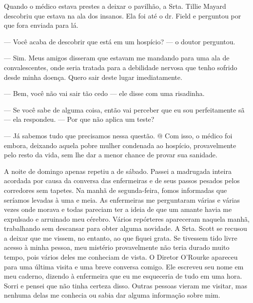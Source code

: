 Quando o médico estava prestes a deixar o pavilhão, a Srta. Tillie
Mayard descobriu que estava na ala dos insanos. Ela foi até o dr. Field
e perguntou por que fora enviada para lá.

--- Você acaba de descobrir que está em um hospício? --- o doutor
perguntou.

--- Sim. Meus amigos disseram que estavam me mandando para uma ala de
convalescentes, onde seria tratada para a debilidade nervosa que tenho
sofrido desde minha doença. Quero sair deste lugar imediatamente.

--- Bem, você não vai sair tão cedo --- ele disse com uma risadinha.

--- Se você sabe de alguma coisa, então vai perceber que eu sou
perfeitamente sã --- ela respondeu. --- Por que não aplica um teste?

--- Já sabemos tudo que precisamos nessa questão. @ Com isso, o médico
foi embora, deixando aquela pobre mulher condenada ao hospício,
provavelmente pelo resto da vida, sem lhe dar a menor chance de provar
sua sanidade.

A noite de domingo apenas repetiu a de sábado. Passei a madrugada
inteira acordada por causa da conversa das enfermeiras e de seus passos
pesados pelos corredores sem tapetes. Na manhã de segunda-feira, fomos
informadas que seríamos levadas à uma e meia. As enfermeiras me
perguntaram várias e várias vezes onde morava e todas pareciam ter a
ideia de que um amante havia me expulsado e arruinado meu cérebro.
Vários repórteres apareceram naquela manhã, trabalhando sem descansar
para obter alguma novidade. A Srta. Scott se recusou a deixar que me
vissem, no entanto, ao que fiquei grata. Se tivessem tido livre acesso à
minha pessoa, meu mistério provavelmente não teria durado muito tempo,
pois vários deles me conheciam de vista. O Diretor O'Rourke apareceu
para uma última visita e uma breve conversa comigo. Ele escreveu seu
nome em meu caderno, dizendo à enfermeira que eu me esqueceria de tudo
em uma hora. Sorri e pensei que não tinha certeza disso. Outras pessoas
vieram me visitar, mas nenhuma delas me conhecia ou sabia dar alguma
informação sobre mim.

